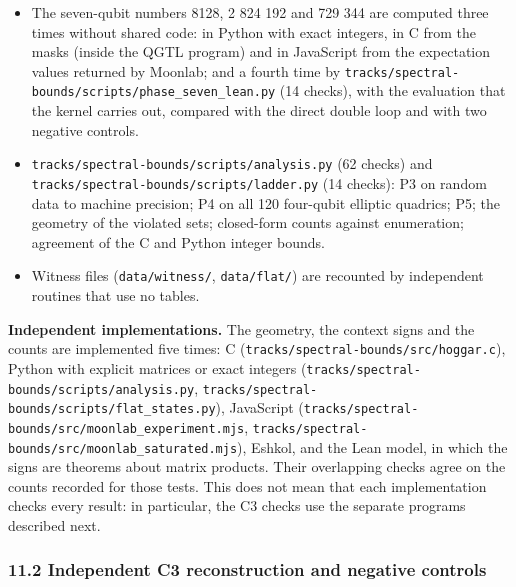 \documentclass[11pt,a4paper]{article}
\begin{document}
\begin{itemize}
  \nolinkurl{tracks/spectral-bounds/scripts/run_family7.sh} (about eight core-hours, not part of the everyday run): the enumeration of
  Theorem 13, the orbit computation, and the random census of the other types; its output is
  \nolinkurl{tracks/spectral-bounds/results/family7.log}. The two counts agree: 13 271 040 solutions found, and
  \(92\,897\,280/7 = 13\,271\,040\) for one orbit with a stabilizer of order 7.
\item
  The seven-qubit numbers 8128, 2 824 192 and 729 344 are computed three times without shared code: in
  Python with exact integers, in C from the masks (inside the QGTL program) and in JavaScript from the
  expectation values returned by Moonlab; and a fourth time by \nolinkurl{tracks/spectral-bounds/scripts/phase_seven_lean.py} (14
  checks), with the evaluation that the kernel carries out, compared with the direct double loop and
  with two negative controls.
\item
  \nolinkurl{tracks/spectral-bounds/scripts/analysis.py} (62 checks) and \nolinkurl{tracks/spectral-bounds/scripts/ladder.py} (14 checks): P3 on random data to machine
  precision; P4 on all 120 four-qubit elliptic quadrics; P5; the geometry of the violated sets; closed-form
  counts against enumeration; agreement of the C and Python integer bounds.
\item
  Witness files (\texttt{data/witness/}, \texttt{data/flat/}) are recounted by independent routines that use no tables.
\end{itemize}

\textbf{Independent implementations.} The geometry, the context signs and the counts are implemented five
times: C (\texttt{tracks/spectral-bounds/src/hoggar.c}), Python with explicit matrices or exact integers (\nolinkurl{tracks/spectral-bounds/scripts/analysis.py},
\nolinkurl{tracks/spectral-bounds/scripts/flat_states.py}), JavaScript (\nolinkurl{tracks/spectral-bounds/src/moonlab_experiment.mjs}, \nolinkurl{tracks/spectral-bounds/src/moonlab_saturated.mjs}),
Eshkol, and the Lean model, in which the signs are theorems about matrix products. Their overlapping
checks agree on the counts recorded for those tests. This does not mean that each implementation
checks every result: in particular, the C3 checks use the separate programs described next.

\subsubsection{11.2 Independent C3 reconstruction and negative controls}\label{112-independent-c3-reconstruction-and-negative-controls}
\end{document}
